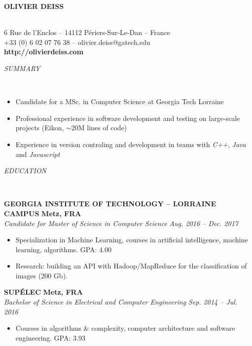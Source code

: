 \documentclass[a4paper, 12pt]{article}
\newcommand{\marginline}{-0.3cm}
\newcommand{\margincontent}{-0.6cm}
\newcommand{\marginsummary}{-0.3cm}
\newcommand{\marginbeforesection}{0.3cm}
\newcommand{\marginaftersummary}{0.2cm}
\newcommand{\linewidthperso}{0.02cm}
\newcommand{\stylesection}[1]{
  \vspace{\marginbeforesection}
  \begin{normalsize}\textit{#1}\end{normalsize}
  \vspace{\marginline}\\
  \noindent\makebox[\linewidth]{\rule{\textwidth}{\linewidthperso}}

}
\newcommand{\styletitle}[1]{\textbf{#1}}
\newcommand{\styledesc}[1]{\textit{#1}}
\newcommand{\styleloc}[1]{\textbf{#1}}
\newcommand{\styledates}[1]{\textit{#1}}
\begin{document}
\begin{footnotesize}

\begin{center}
  \begin{small}\textbf{OLIVIER DEISS}\end{small}\\
  6 Rue de l'Enclos -- 14112 P\'eriers-Sur-Le-Dan -- France\\
  +33 (0) 6 02 07 76 38 -- olivier.deiss@gatech.edu\\
  \textbf{http://olivierdeiss.com}
\end{center}

\stylesection{SUMMARY}

\vspace{\marginsummary}
\begin{itemize}
  \item Candidate for a MSc. in Computer Science at Georgia Tech Lorraine
  \item Professional experience in software development and testing on large-scale projects (Eikon, $\sim$20M lines of code)
  \item Experience in version controling and development in teams with \textit{C++}, \textit{Java} and \textit{Javascript}
\end{itemize}
\vspace{\marginaftersummary}

\stylesection{EDUCATION}

\styletitle{GEORGIA INSTITUTE OF TECHNOLOGY -- LORRAINE CAMPUS} \hfill \styleloc{Metz, FRA}\\
\styledesc{Candidate for Master of Science in Computer Science} \hfill \styledates{Aug. 2016 -- Dec. 2017}\\
\vspace{\margincontent}
\begin{itemize}
  \item Specialization in Machine Learning, courses in artificial intelligence, machine learning, algorithms. \hfill GPA: 4.00
  \item Research: building an API with Hadoop/MapReduce for the classification of images (200 Gb).
\end{itemize}

\styletitle{SUP\'ELEC} \hfill \styleloc{Metz, FRA}\\
\styledesc{Bachelor of Science in Electrical and Computer Engineering} \hfill \styledates{Sep. 2014 -- Jul. 2016}\\
\vspace{\margincontent}
\begin{itemize}
  \item Courses in algorithms \& complexity, computer architecture and software engineering. \hfill GPA: 3.93
\end{itemize}


\end{footnotesize}
\end{document}
